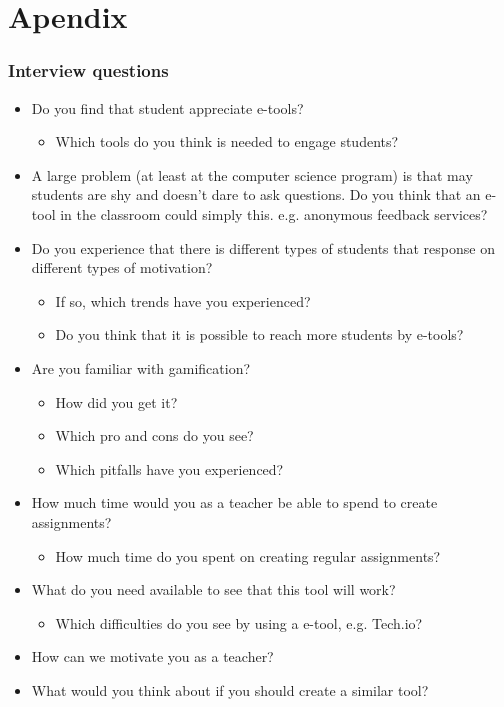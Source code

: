 \chapter{Apendix}
\subsection{Interview questions}\label{Interview:questions} 

\begin{itemize}
 \item Do you find that student appreciate e-tools?
 \begin{itemize}
 \item Which tools do you think is needed to engage students?
 \end{itemize}
 
 \item A large problem (at least at the computer science program) is that may students are shy and doesn't dare to ask questions. Do you think that an e-tool in the classroom could simply this. e.g. anonymous feedback services? 

 
 \item Do you experience that there is different types of students that response on different types of motivation?
 \begin{itemize}
 \item If so, which trends have you experienced?
 \item Do you think that it is possible to reach more students by e-tools?
 \end{itemize}
 
 \item Are you familiar with gamification?
 \begin{itemize}
 \item How did you get it?
 \item Which pro and cons do you see?
 \item Which pitfalls have you experienced?
 \end{itemize}
 
 \item  How much time would you as a teacher be able to spend to create assignments?
 \begin{itemize}
 \item How much time do you spent on creating regular assignments?
 \end{itemize}
 
 \item What do you need available to see that this tool will work?
 \begin{itemize}
 \item Which difficulties do you see by using a e-tool, e.g. Tech.io?
 \end{itemize}
\item How can we motivate you as a teacher?
\item What would you think about if you should create a similar tool?

\end{itemize}
